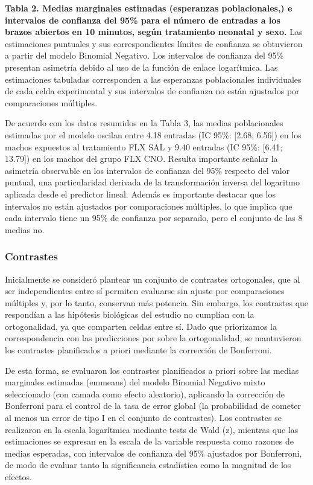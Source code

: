 \documentclass[
  letterpaper,
  DIV=11,
  numbers=noendperiod]{scrartcl}
\begin{document}
\textbf{Tabla 2. Medias marginales estimadas (esperanzas poblacionales,)
e intervalos de confianza del 95\% para el número de entradas a los
brazos abiertos en 10 minutos, según tratamiento neonatal y sexo.} Las
estimaciones puntuales y sus correspondientes límites de confianza se
obtuvieron a partir del modelo Binomial Negativo. Los intervalos de
confianza del 95\% presentan asimetría debido al uso de la función de
enlace logarítmica. Las estimaciones tabuladas corresponden a las
esperanzas poblacionales individuales de cada celda experimental y sus
intervalos de confianza no están ajustados por comparaciones múltiples.

De acuerdo con los datos resumidos en la Tabla 3, las medias
poblacionales estimadas por el modelo oscilan entre 4.18 entradas (IC
95\%: {[}2.68; 6.56{]}) en los machos expuestos al tratamiento FLX SAL y
9.40 entradas (IC 95\%: {[}6.41; 13.79{]}) en los machos del grupo FLX
CNO. Resulta importante señalar la asimetría observable en los
intervalos de confianza del 95\% respecto del valor puntual, una
particularidad derivada de la transformación inversa del logaritmo
aplicada desde el predictor lineal. Además es importante destacar que
los intervalos no están ajustados por comparaciones múltiples, lo que
implica que cada intervalo tiene un 95\% de confianza por separado, pero
el conjunto de las 8 medias no.~

\subsubsection{Contrastes}\label{contrastes}

Inicialmente se consideró plantear un conjunto de contrastes
ortogonales, que al ser independientes entre sí permiten evaluarse sin
ajuste por comparaciones múltiples y, por lo tanto, conservan más
potencia. Sin embargo, los contrastes que respondían a las hipótesis
biológicas del estudio no cumplían con la ortogonalidad, ya que
comparten celdas entre sí. Dado que priorizamos la correspondencia con
las predicciones por sobre la ortogonalidad, se mantuvieron los
contrastes planificados a priori mediante la corrección de Bonferroni.~

De esta forma, se evaluaron los contrastes planificados a priori sobre
las medias marginales estimadas (emmeans) del modelo Binomial Negativo
mixto seleccionado (con camada como efecto aleatorio), aplicando la
corrección de Bonferroni para el control de la tasa de error global (la
probabilidad de cometer al menos un error de tipo I en el conjunto de
contrastes). Los contrastes se realizaron en la escala logarítmica
mediante tests de Wald (z), mientras que las estimaciones se expresan en
la escala de la variable respuesta como razones de medias esperadas, con
intervalos de confianza del 95\% ajustados por Bonferroni, de modo de
evaluar tanto la significancia estadística como la magnitud de los
efectos.
\end{document}

